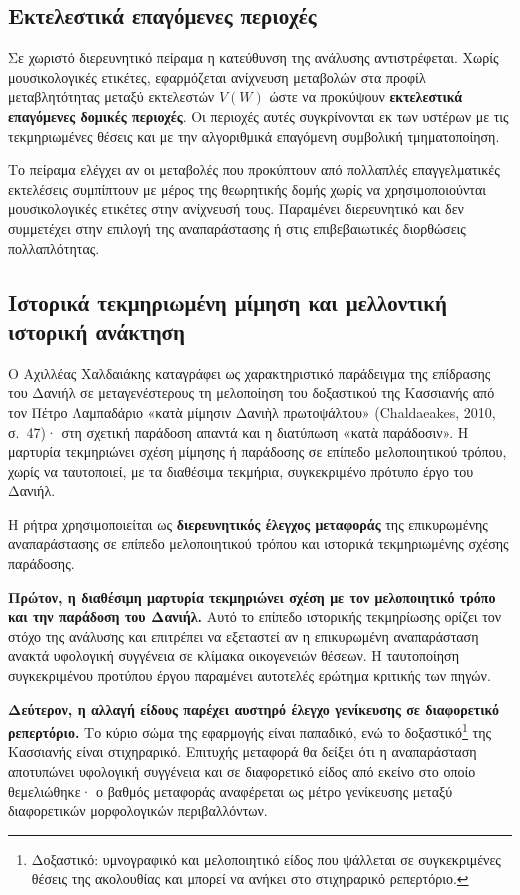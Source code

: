 \documentclass[11pt,a4paper]{article}
\begin{document}
\subsection{Εκτελεστικά επαγόμενες περιοχές}\label{app:robust-performance}

Σε χωριστό διερευνητικό πείραμα η κατεύθυνση της ανάλυσης αντιστρέφεται. Χωρίς μουσικολογικές ετικέτες, εφαρμόζεται ανίχνευση μεταβολών στα προφίλ μεταβλητότητας μεταξύ εκτελεστών \(V(W)\) ώστε να προκύψουν \textbf{εκτελεστικά επαγόμενες δομικές περιοχές}. Οι περιοχές αυτές συγκρίνονται εκ των υστέρων με τις τεκμηριωμένες θέσεις και με την αλγοριθμικά επαγόμενη συμβολική τμηματοποίηση.

Το πείραμα ελέγχει αν οι μεταβολές που προκύπτουν από πολλαπλές επαγγελματικές εκτελέσεις συμπίπτουν με μέρος της θεωρητικής δομής χωρίς να χρησιμοποιούνται μουσικολογικές ετικέτες στην ανίχνευσή τους. Παραμένει διερευνητικό και δεν συμμετέχει στην επιλογή της αναπαράστασης ή στις επιβεβαιωτικές διορθώσεις πολλαπλότητας.

\subsection{Ιστορικά τεκμηριωμένη μίμηση και μελλοντική ιστορική ανάκτηση}\label{app:robust-ανάκτηση}

Ο Αχιλλέας Χαλδαιάκης καταγράφει ως χαρακτηριστικό παράδειγμα της επίδρασης του Δανιήλ σε μεταγενέστερους τη μελοποίηση του δοξαστικού της Κασσιανής από τον Πέτρο Λαμπαδάριο «κατὰ μίμησιν Δανιὴλ πρωτοψάλτου» (Chaldaeakes, 2010, σ.~47)· στη σχετική παράδοση απαντά και η διατύπωση «κατὰ παράδοσιν». Η μαρτυρία τεκμηριώνει σχέση μίμησης ή παράδοσης σε επίπεδο μελοποιητικού τρόπου, χωρίς να ταυτοποιεί, με τα διαθέσιμα τεκμήρια, συγκεκριμένο πρότυπο έργο του Δανιήλ.

Η ρήτρα χρησιμοποιείται ως \textbf{διερευνητικός έλεγχος μεταφοράς} της επικυρωμένης αναπαράστασης σε επίπεδο μελοποιητικού τρόπου και ιστορικά τεκμηριωμένης σχέσης παράδοσης.

\textbf{Πρώτον, η διαθέσιμη μαρτυρία τεκμηριώνει σχέση με τον μελοποιητικό τρόπο και την παράδοση του Δανιήλ.} Αυτό το επίπεδο ιστορικής τεκμηρίωσης ορίζει τον στόχο της ανάλυσης και επιτρέπει να εξεταστεί αν η επικυρωμένη αναπαράσταση ανακτά υφολογική συγγένεια σε κλίμακα οικογενειών θέσεων. Η ταυτοποίηση συγκεκριμένου προτύπου έργου παραμένει αυτοτελές ερώτημα κριτικής των πηγών.

\textbf{Δεύτερον, η αλλαγή είδους παρέχει αυστηρό έλεγχο γενίκευσης σε διαφορετικό ρεπερτόριο.} Το κύριο σώμα της εφαρμογής είναι παπαδικό, ενώ το δοξαστικό\footnote{Δοξαστικό: υμνογραφικό και μελοποιητικό είδος που ψάλλεται σε συγκεκριμένες θέσεις της ακολουθίας και μπορεί να ανήκει στο στιχηραρικό ρεπερτόριο.} της Κασσιανής είναι στιχηραρικό. Επιτυχής μεταφορά θα δείξει ότι η αναπαράσταση αποτυπώνει υφολογική συγγένεια και σε διαφορετικό είδος από εκείνο στο οποίο θεμελιώθηκε· ο βαθμός μεταφοράς αναφέρεται ως μέτρο γενίκευσης μεταξύ διαφορετικών μορφολογικών περιβαλλόντων.
\end{document}
